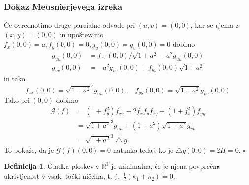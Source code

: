 \documentclass[8pt]{beamer}
\theoremstyle{definition}
\newtheorem{definicija}{Definicija}
\theoremstyle{remark}
\theoremstyle{plain}
\numberwithin{equation}{section}  %
\begin{document}
\begin{frame}
    \frametitle{Dokaz Meusnierjevega izreka}

    Če ovrednotimo druge parcialne odvode pri $(u, v)=(0,0)$, kar se ujema z $(x, y)=(0,0)$ in upoštevamo $f_x(0,0)=a, f_y(0,0)=0, g_u(0,0)=g_v(0,0)=0$ dobimo 
    \begin{align*}
        g_{u u}(0,0) & =f_{x x}(0,0) / \sqrt{1+a^2}-a^2 g_{u u}(0,0) \\
        g_{v v}(0,0) & =-a^2 g_{v v}(0,0)+f_{y y}(0,0) \sqrt{1+a^2}
    \end{align*}
    in tako 
    \begin{equation*}
        f_{x x}(0,0)={\sqrt{1+a^2}}^3 g_{u u}(0,0), \quad f_{y y}(0,0)=\sqrt{1+a^2} g_{v v}(0,0)
    \end{equation*}
    Tako pri $(0,0)$ dobimo
    \begin{align*}
        \mathscr{G}(f) & =\left(1+f_y^2\right) f_{x x}-2 f_x f_y f_{x y}+\left(1+f_x^2\right) f_{y y} \\
        & ={\sqrt{1+a^2}}^3 g_{u u}+\left(1+a^2\right) \sqrt{1+a^2} g_{v v} \\
        & ={\sqrt{1+a^2}}^3 \bigtriangleup g .
    \end{align*}
    To pokaže, da je $\mathscr{G}(f)(0,0)=0$ natanko tedaj, ko je $\bigtriangleup g(0,0)=2H=0$. \hfill $\square$

    \begin{definicija}
        Gladka ploskev v $\mathbb{R}^3$ je \textcolor{red1}{minimalna}, če je njena povprečna ukrivljenost v vsaki točki ničelna, t.~j.~$\frac{1}{2}(\kappa_1+\kappa_2)=0$.
    \end{definicija}
\end{frame}
\end{document}
